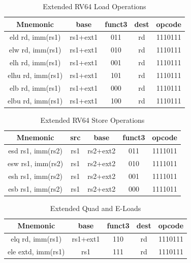 \documentclass{article}
\begin{document}
\begin{center}
\begin{small}

\begin{table}[H]
\caption{Extended RV64 Load Operations}
\begin{center}
\begin{tabular}{| c | c | c | c | c | }
\hline
Mnemonic & base & funct3 & dest & opcode \\ \hline
\hline
eld rd, imm(rs1) & rs1+ext1 & 011 & rd & 1110111\\
\hline
elw rd, imm(rs1) & rs1+ext1 & 010 & rd & 1110111\\
\hline
elh rd, imm(rs1) & rs1+ext1 & 001 & rd & 1110111\\
\hline
elhu rd, imm(rs1) & rs1+ext1 & 101 & rd & 1110111\\
\hline
elb rd, imm(rs1) & rs1+ext1 & 000 & rd & 1110111\\
\hline
elbu rd, imm(rs1) & rs1+ext1 & 100 & rd & 1110111\\
\hline
\end{tabular}
\end{center}
\end{table}

\begin{table}[H]
\caption{Extended RV64 Store Operations}
\begin{center}
\begin{tabular}{| c | c | c | c | c | }
\hline
Mnemonic & src & base & funct3 & opcode \\ \hline
\hline
esd rs1, imm(rs2) & rs1 & rs2+ext2 & 011 & 1111011\\
\hline
esw rs1, imm(rs2) & rs1 & rs2+ext2 & 010 & 1111011\\
\hline
esh rs1, imm(rs2) & rs1 & rs2+ext2 & 001 & 1111011\\
\hline
esb rs1, imm(rs2) & rs1 & rs2+ext2 & 000 & 1111011\\
\hline
\end{tabular}
\end{center}
\end{table}

\begin{table}[H]
\caption{Extended Quad and E-Loads}
\begin{center}
\begin{tabular}{| c | c | c | c | c | }
\hline
Mnemonic & base & funct3 & dest & opcode \\ \hline
\hline
elq rd, imm(rs1) & rs1+ext1 & 110 & rd & 1110111\\
\hline
ele extd, imm(rs1) & rs1 & 111 & rd & 1110111\\
\hline
\end{tabular}
\end{center}
\end{table}


\end{small}
\end{center}
\end{document}
